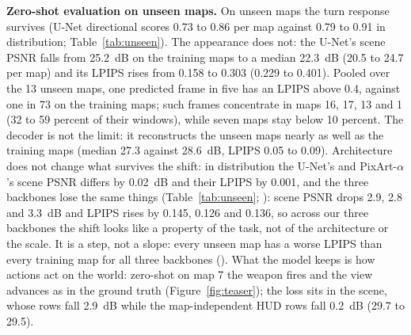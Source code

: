 \textbf{Zero-shot evaluation on unseen maps.} On unseen maps the turn response survives (U-Net directional scores 0.73 to 0.86 per map against 0.79 to 0.91 in distribution; Table~\ref{tab:unseen}).
The appearance does not: the U-Net's scene PSNR falls from 25.2~dB on the training maps to a median 22.3~dB (20.5 to 24.7 per map) and its LPIPS rises from 0.158 to 0.303 (0.229 to 0.401).
Pooled over the 13 unseen maps, one predicted frame in five has an LPIPS above 0.4, against one in 73 on the training maps; such frames concentrate in maps 16, 17, 13 and 1 (32 to 59 percent of their windows), while seven maps stay below 10 percent.
The decoder is not the limit: it reconstructs the unseen maps nearly as well as the training maps (median 27.3 against 28.6~dB, LPIPS 0.05 to 0.09).
Architecture does not change what survives the shift: in distribution the U-Net's and PixArt-$\alpha$'s scene PSNR differs by 0.02~dB and their LPIPS by 0.001, and the three backbones lose the same things (Table~\ref{tab:unseen}; ): scene PSNR drops 2.9, 2.8 and 3.3~dB and LPIPS rises by 0.145, 0.126 and 0.136, so across our three backbones the shift looks like a property of the task, not of the architecture or the scale.
It is a step, not a slope: every unseen map has a worse LPIPS than every training map for all three backbones ().
What the model keeps is how actions act on the world: zero-shot on map 7 the weapon fires and the view advances as in the ground truth (Figure~\ref{fig:teaser}); the loss sits in the scene, whose rows fall 2.9~dB while the map-independent HUD rows fall 0.2~dB (29.7 to 29.5).
